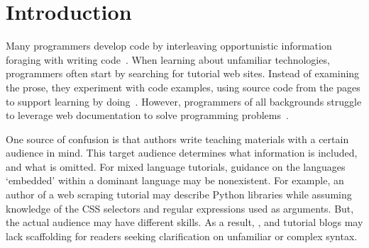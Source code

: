 \section{Introduction}

Many programmers develop code by interleaving opportunistic information foraging with writing code~\cite{brandt_two_2009,brandt_example-centric_2010}.
When learning about unfamiliar technologies, programmers often start by searching for tutorial web sites.
Instead of examining the prose, they experiment with code examples, using source code from the pages to support learning by doing~\cite{brandt_two_2009}.
However, programmers of all backgrounds struggle to leverage web documentation to solve programming problems~\cite{duala-ekoko_asking_2012,dorn_lost_2013,dorn_learning_2010}.

One source of confusion is that authors write teaching materials with a certain audience in mind.
This target audience determines what information is included, and what is omitted.
For mixed language tutorials, guidance on the languages `embedded' within a dominant language may be nonexistent.
For example, an author of a web scraping tutorial may describe Python libraries while assuming knowledge of the CSS selectors and regular expressions used as arguments.
But, the actual audience may have different skills.
As a result, , and tutorial blogs may lack scaffolding for readers seeking clarification on unfamiliar or complex syntax.

